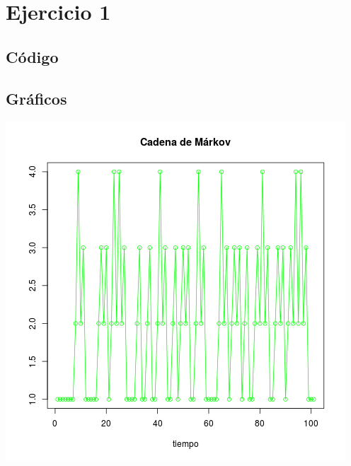 \documentclass[paper=letter, fontsize=12pt]{scrartcl} %
\numberwithin{equation}{section} %
\numberwithin{figure}{section} %
\numberwithin{table}{section} %
\begin{document}


\section{Ejercicio 1}

\subsection{Código}



\subsection{Gráficos}

\includegraphics[scale=0.5]{ej1_1.png}
\end{document}
